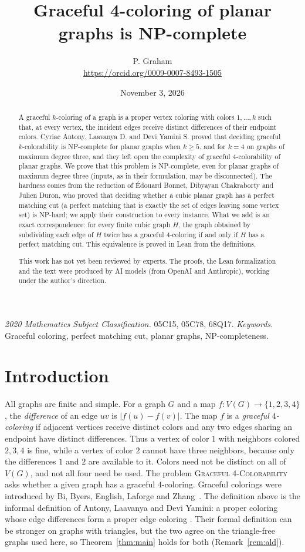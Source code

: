 \documentclass[11pt]{article}
\title{Graceful 4-coloring of planar graphs is NP-complete}
\author{P. Graham\\ \small\url{https://orcid.org/0009-0007-8493-1505}}
\date{November 3, 2026}
\newcommand{\GFC}{\textup{\textsc{Graceful 4-Colorability}}}
\theoremstyle{remark}
\begin{document}
\maketitle
\begin{abstract}
A graceful $k$-coloring of a graph is a proper vertex coloring with colors
$1,\dots,k$ such that, at every vertex, the incident edges receive distinct
differences of their endpoint colors. Cyriac Antony, Laavanya D. and Devi
Yamini S. proved that deciding graceful $k$-colorability is NP-complete for
planar graphs when $k\ge 5$, and for $k=4$ on graphs of maximum degree three,
and they left open the complexity of graceful 4-colorability of planar graphs.
We prove that this problem is NP-complete, even for planar graphs of maximum
degree three (inputs, as in their formulation, may be disconnected). The
hardness comes from the reduction of \'Edouard Bonnet, Dibyayan Chakraborty
and Julien Duron, who proved that deciding whether a cubic planar graph has a
perfect matching cut (a perfect matching that is exactly the set of edges
leaving some vertex set) is NP-hard; we apply their construction to every
instance. What we add is an exact correspondence: for every finite cubic graph
$H$, the graph obtained by subdividing each edge of $H$ twice has a graceful
4-coloring if and only if $H$ has a perfect matching cut. This equivalence is
proved in Lean from the definitions.

This work has not yet been reviewed by experts.
The proofs, the Lean formalization and the text were produced by AI models (from OpenAI and Anthropic), working under the author's direction.
\end{abstract}
\medskip
\noindent\textit{2020 Mathematics Subject Classification.} 05C15, 05C78, 68Q17.
\textit{Keywords.} Graceful coloring, perfect matching cut, planar graphs, NP-completeness.

\section{Introduction}

All graphs are finite and simple. For a graph $G$ and a map
$f\colon V(G)\to\{1,2,3,4\}$, the \emph{difference} of an edge $uv$ is
$|f(u)-f(v)|$. The map $f$ is a \emph{graceful $4$-coloring} if adjacent
vertices receive distinct colors and any two edges sharing an endpoint have
distinct differences. Thus a vertex of color $1$ with neighbors colored
$2,3,4$ is fine, while a vertex of color $2$ cannot have three neighbors,
because only the differences $1$ and $2$ are available to it. Colors need
not be distinct on all of $V(G)$, and not all four need be used. The
problem \GFC{} asks whether a given graph has a
graceful $4$-coloring. Graceful colorings were introduced by Bi, Byers,
English, Laforge and Zhang~\cite{Bi}. The definition above is the informal
definition of Antony, Laavanya and Devi Yamini: a proper coloring whose edge
differences form a proper edge coloring \cite[Section~1]{ALD}. Their formal
definition can be stronger on graphs with triangles, but the two agree on the
triangle-free graphs used here, so Theorem~\ref{thm:main} holds for both
(Remark~\ref{rem:ald}).
\end{document}
